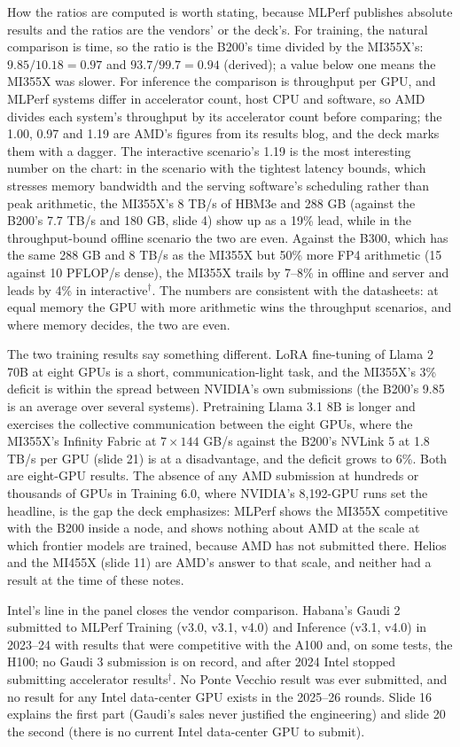 \documentclass[11pt,letterpaper]{article}
\begin{document}
How the ratios are computed is worth stating, because MLPerf publishes absolute results and the ratios are the vendors' or the deck's. For training, the natural comparison is time, so the ratio is the B200's time divided by the MI355X's: $9.85/10.18 = 0.97$ and $93.7/99.7 = 0.94$ (derived); a value below one means the MI355X was slower. For inference the comparison is throughput per GPU, and MLPerf systems differ in accelerator count, host CPU and software, so AMD divides each system's throughput by its accelerator count before comparing; the 1.00, 0.97 and 1.19 are AMD's figures from its results blog, and the deck marks them with a dagger. The interactive scenario's 1.19 is the most interesting number on the chart: in the scenario with the tightest latency bounds, which stresses memory bandwidth and the serving software's scheduling rather than peak arithmetic, the MI355X's 8 TB/s of HBM3e and 288 GB (against the B200's 7.7 TB/s and 180 GB, slide 4) show up as a 19\% lead, while in the throughput-bound offline scenario the two are even. Against the B300, which has the same 288 GB and 8 TB/s as the MI355X but 50\% more FP4 arithmetic (15 against 10 PFLOP/s dense), the MI355X trails by 7--8\% in offline and server and leads by 4\% in interactive$^\dagger$. The numbers are consistent with the datasheets: at equal memory the GPU with more arithmetic wins the throughput scenarios, and where memory decides, the two are even.

The two training results say something different. LoRA fine-tuning of Llama 2 70B at eight GPUs is a short, communication-light task, and the MI355X's 3\% deficit is within the spread between NVIDIA's own submissions (the B200's 9.85 is an average over several systems). Pretraining Llama 3.1 8B is longer and exercises the collective communication between the eight GPUs, where the MI355X's Infinity Fabric at $7 \times 144$ GB/s against the B200's NVLink 5 at 1.8 TB/s per GPU (slide 21) is at a disadvantage, and the deficit grows to 6\%. Both are eight-GPU results. The absence of any AMD submission at hundreds or thousands of GPUs in Training 6.0, where NVIDIA's 8,192-GPU runs set the headline, is the gap the deck emphasizes: MLPerf shows the MI355X competitive with the B200 inside a node, and shows nothing about AMD at the scale at which frontier models are trained, because AMD has not submitted there. Helios and the MI455X (slide 11) are AMD's answer to that scale, and neither had a result at the time of these notes.

Intel's line in the panel closes the vendor comparison. Habana's Gaudi 2 submitted to MLPerf Training (v3.0, v3.1, v4.0) and Inference (v3.1, v4.0) in 2023--24 with results that were competitive with the A100 and, on some tests, the H100; no Gaudi 3 submission is on record, and after 2024 Intel stopped submitting accelerator results$^\dagger$. No Ponte Vecchio result was ever submitted, and no result for any Intel data-center GPU exists in the 2025--26 rounds. Slide 16 explains the first part (Gaudi's sales never justified the engineering) and slide 20 the second (there is no current Intel data-center GPU to submit).
\end{document}
